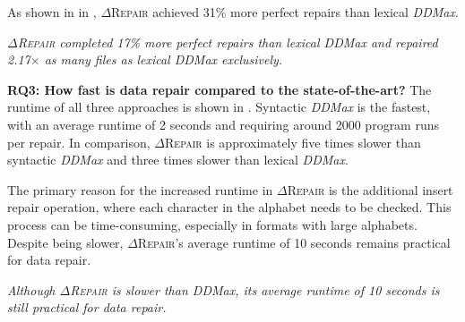 \documentclass[acmsmall,screen,review,anonymous]{acmart}
\newenvironment{result}{\begin{framed}\centering\it}{\end{framed}}
\newcommand{\dtask}{data repair\xspace}
\newcommand{\approach}{\textsc{$\Delta$Repair}\xspace}
\newcommand{\ddmax}{\textit{DDMax}\xspace}
\newcommand{\drepair}{\approach}
\begin{document}
As shown in in ,
\drepair achieved 31\% more perfect repairs than lexical \ddmax.


\begin{result}
\drepair completed 17\% more perfect repairs than lexical \ddmax and
repaired 2.17$\times$ as many files as lexical \ddmax exclusively.
\end{result}


\noindent\textbf{RQ3: How fast is \dtask compared to the state-of-the-art?}
The runtime of all three approaches is shown in .
Syntactic \ddmax is the fastest, with an average runtime of 2 seconds and
requiring around 2000 program runs per repair.
In comparison, \drepair is approximately five times slower than syntactic
\ddmax and three times slower than lexical \ddmax.

The primary reason for the increased runtime in \drepair is the additional
insert repair operation, where each character in the alphabet needs to be
checked. This process can be time-consuming, especially in formats with
large alphabets.
Despite being slower, \drepair's average runtime of 10 seconds remains practical
for \dtask.

\begin{result}
Although \drepair is slower than \ddmax, its average runtime of 10 seconds is
still practical for \dtask.
\end{result}
\end{document}
